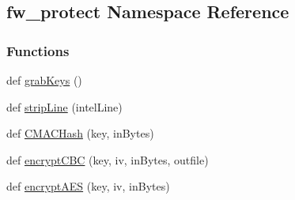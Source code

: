 \hypertarget{namespacefw__protect}{}\subsection{fw\+\_\+protect Namespace Reference}
\label{namespacefw__protect}
\subsubsection*{Functions}
\begin{DoxyCompactItemize}
\item 
def \hyperlink{namespacefw__protect_aa68fe4d7a127575d7e2402bbdb718a29}{grab\+Keys} ()
\item 
def \hyperlink{namespacefw__protect_a3bce2fdee1937d3e624afc2055db2dbf}{strip\+Line} (intel\+Line)
\item 
def \hyperlink{namespacefw__protect_a54f5aa6464f7083b24fed44f31279165}{C\+M\+A\+C\+Hash} (key, in\+Bytes)
\item 
def \hyperlink{namespacefw__protect_a9930b517bb3d82347a839b7bacac3316}{encrypt\+C\+BC} (key, iv, in\+Bytes, outfile)
\item 
def \hyperlink{namespacefw__protect_a4f6e6aec497cff38b557c332381cbabd}{encrypt\+A\+ES} (key, iv, in\+Bytes)
\end{DoxyCompactItemize}
